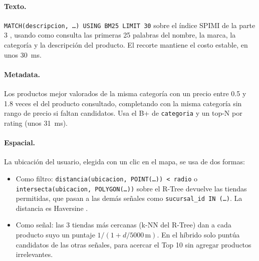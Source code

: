 \paragraph{Texto.} \texttt{MATCH(descripcion, \ldots) USING BM25 LIMIT 30} sobre el índice SPIMI de la parte 3 \citep{robertson}, usando como consulta las primeras 25 palabras del nombre, la marca, la categoría y la descripción del producto. El recorte mantiene el costo estable, en unos 30~ms.

\paragraph{Metadata.} Los productos mejor valorados de la misma categoría con un precio entre 0.5 y 1.8 veces el del producto consultado, completando con la misma categoría sin rango de precio si faltan candidatos. Usa el B+ de \texttt{categoria} y un top-N por rating (unos 31~ms).

\paragraph{Espacial.} La ubicación del usuario, elegida con un clic en el mapa, se usa de dos formas:
\begin{itemize}
  \item Como filtro: \texttt{distancia(ubicacion, POINT(\ldots)) < radio} o \texttt{intersecta(ubicacion, POLYGON(\ldots))} sobre el R-Tree \citep{guttman} devuelve las tiendas permitidas, que pasan a las demás señales como \texttt{sucursal\_id IN (\ldots)}. La distancia es Haversine \citep{sinnott}.
  \item Como señal: las 3 tiendas más cercanas (k-NN del R-Tree) dan a cada producto suyo un puntaje $1 / (1 + d / 5000\,\text{m})$. En el híbrido solo puntúa candidatos de las otras señales, para acercar el Top 10 sin agregar productos irrelevantes.
\end{itemize}

